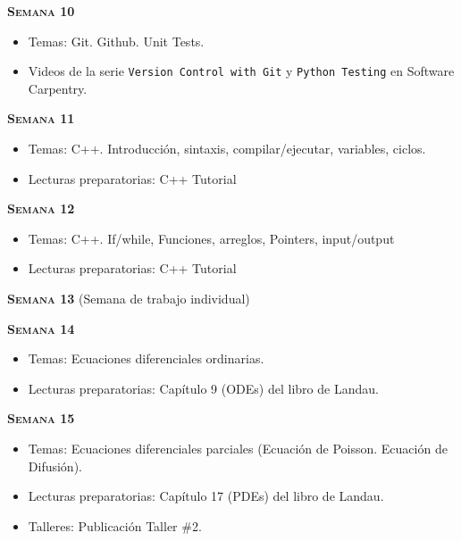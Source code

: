 \documentclass[letterpaper,10pt,onecolumn]{article}
\begin{document}
\noindent\textbf{\textsc{Semana 10}}\\[-0.5cm]
\begin{itemize}
\item Temas: Git. Github. Unit Tests. \\[-0.6cm]
\item Videos de la serie \texttt{Version Control with Git} y
  \texttt{Python Testing}  en Software Carpentry.\\[-0.6cm]    
\end{itemize}

\noindent\textbf{\textsc{Semana 11}}\\[-0.5cm]
\begin{itemize}
\item Temas: C++. Introducción, sintaxis, compilar/ejecutar,
variables, ciclos. \\[-0.6cm]
\item Lecturas preparatorias: C++ Tutorial\\[-0.6cm]
\end{itemize}


\noindent\textbf{\textsc{Semana 12}}\\[-0.5cm]
\begin{itemize}
\item Temas: C++. If/while, Funciones, arreglos, Pointers, input/output \\[-0.6cm]
\item Lecturas preparatorias: C++ Tutorial\\[-0.6cm]
\end{itemize}

\noindent\textbf{\textsc{Semana 13}} (Semana de trabajo individual)

\noindent\textbf{\textsc{Semana 14}}\\[-0.5cm]
\begin{itemize}
\item Temas: Ecuaciones diferenciales ordinarias. \\[-0.6cm]
\item Lecturas preparatorias: Cap\'itulo 9 (ODEs) del libro de
  Landau. \\[-0.6cm] 
\end{itemize}

\noindent\textbf{\textsc{Semana 15}}\\[-0.5cm]
\begin{itemize}
\item Temas: Ecuaciones diferenciales parciales (Ecuaci\'on de
  Poisson. Ecuaci\'on de Difusi\'on). \\[-0.6cm]
\item Lecturas preparatorias: Cap\'itulo 17 (PDEs) del libro de
  Landau. \\[-0.6cm] 
\item Talleres: Publicaci\'on Taller \#2. \\[-0.6cm]
\end{itemize}
\end{document}
